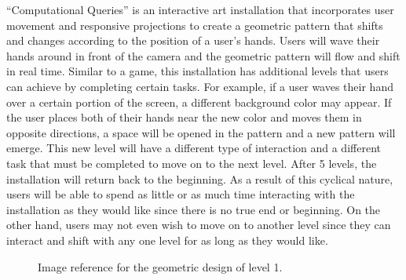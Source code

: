 \documentclass[10pt,twocolumn]{article}
\begin{document}
``Computational Queries'' is an interactive art installation that incorporates user movement and responsive projections to create a geometric pattern that shifts and changes according to the position of a user's hands.  Users will wave their hands around in front of the camera and the geometric pattern will flow and shift in real time. Similar to a game, this installation has additional levels that users can achieve by completing certain tasks.  For example, if a user waves their hand over a certain portion of the screen, a different background color may appear.  If the user places both of their hands near the new color and moves them in opposite directions, a space will be opened in the pattern and a new pattern will emerge.  This new level will have a different type of interaction and a different task that must be completed to move on to the next level.  After 5 levels, the installation will return back to the beginning.  As a result of this cyclical nature, users will be able to spend as little or as much time interacting with the installation as they would like since there is no true end or beginning. On the other hand, users may not even wish to move on to another level since they can interact and shift with any one level for as long as they would like.  

\begin{figure}[hbh]
\begin{center}
\vspace{.5cm}
\caption{Image reference for the geometric design of level 1.}
\label{fig:geometric}
\end{center}
\end{figure} 
\end{document}
